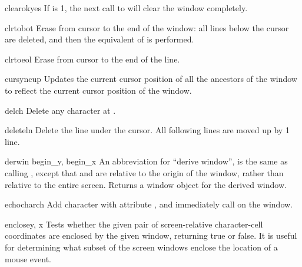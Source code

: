 \begin{methoddesc}[window]{clearok}{yes}
If  is 1, the next call to 
will clear the window completely.
\end{methoddesc}

\begin{methoddesc}[window]{clrtobot}{}
Erase from cursor to the end of the window: all lines below the cursor
are deleted, and then the equivalent of  is performed.
\end{methoddesc}

\begin{methoddesc}[window]{clrtoeol}{}
Erase from cursor to the end of the line.
\end{methoddesc}

\begin{methoddesc}[window]{cursyncup}{}
Updates the current cursor position of all the ancestors of the window
to reflect the current cursor position of the window.
\end{methoddesc}

\begin{methoddesc}[window]{delch}{}
Delete any character at .
\end{methoddesc}

\begin{methoddesc}[window]{deleteln}{}
Delete the line under the cursor. All following lines are moved up
by 1 line.
\end{methoddesc}

\begin{methoddesc}[window]{derwin}{ begin_y, begin_x}
An abbreviation for ``derive window'',  is the same
as calling , except that  and
 are relative to the origin of the window, rather than
relative to the entire screen.  Returns a window object for the
derived window.
\end{methoddesc}

\begin{methoddesc}[window]{echochar}{ch}
Add character  with attribute , and immediately 
call  on the window.
\end{methoddesc}

\begin{methoddesc}[window]{enclose}{y, x}
Tests whether the given pair of screen-relative character-cell
coordinates are enclosed by the given window, returning true or
false.  It is useful for determining what subset of the screen
windows enclose the location of a mouse event.
\end{methoddesc}

